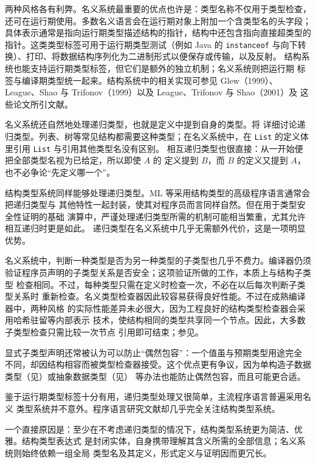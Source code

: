 两种风格各有利弊。名义系统最重要的优点也许是：类型名称不仅用于类型检查，
还可在运行期使用。多数名义语言会在运行期对象上附加一个含类型名的头字段；
具体表示通常是指向运行期类型描述结构的指针，结构中还包含指向直接超类型的
指针。这类类型标签可用于运行期类型测试（例如 Java 的 \texttt{instanceof}
与向下转换）、打印、将数据结构序列化为二进制形式以便保存或传输，以及反射。
结构系统也能支持运行期类型标签，但它们是额外的独立机制；名义系统则把运行期
标签与编译期类型统一起来。结构系统中的相关实现可参见 Glew（1999）、
League、Shao 与 Trifonov（1999）以及 League、Trifonov 与 Shao（2001）及
这些论文所引文献。

名义系统还自然地处理递归类型，也就是定义中提到自身的类型。将
详细讨论递归类型。列表、树等常见结构都需要这种类型；在名义系统中，在
\texttt{List} 的定义体里引用 \texttt{List} 与引用其他类型名没有区别。
相互递归类型也很直接：从一开始便把全部类型名视为已给定，所以即使 \(A\) 的
定义提到 \(B\)，而 \(B\) 的定义又提到 \(A\)，也不必争论“先定义哪一个”。

结构类型系统同样能够处理递归类型。ML 等采用结构类型的高级程序语言通常会把递归类型与
其他特性一起封装，使其对程序员而言同样自然。但在用于类型安全性证明的基础
演算中，严谨处理递归类型所需的机制可能相当繁重，尤其允许相互递归时更是如此。
递归类型在名义系统中几乎无需额外代价，这是一项明显优势。

名义系统中，判断一种类型是否为另一种类型的子类型也几乎不费力。编译器仍须
验证程序员声明的子类型关系是否安全；这项验证所做的工作，本质上与结构子类型
检查相同。不过，每种类型只需在定义时检查一次，不必在以后每次判断子类型关系时
重新检查。名义类型检查器因此较容易获得良好性能。不过在成熟编译器中，两种风格
的实际性能差异未必很大，因为工程良好的结构类型检查器会采用哈希驻留等内部表示
技术，使结构相同的类型共享同一个节点。因此，大多数子类型检查只需比较一次节点
引用即可结束；参见。

显式子类型声明还常被认为可以防止“偶然包容”：一个值虽与预期类型用途完全
不同，却因结构相容而被类型检查器接受。这个优点更有争议，因为单构造子数据
类型（见）或抽象数据类型（见）
等办法也能防止偶然包容，而且可能更合适。

鉴于运行期类型标签十分有用，递归类型处理又很简单，主流程序语言普遍采用名义
类型系统并不意外。程序语言研究文献却几乎完全关注结构类型系统。

一个直接原因是：至少在不考虑递归类型的情况下，结构类型系统更为简洁、优雅。结构类型表达式
是封闭实体，自身携带理解其含义所需的全部信息；名义系统则始终依赖一组全局
类型名及其定义，形式定义与证明因而更冗长。

